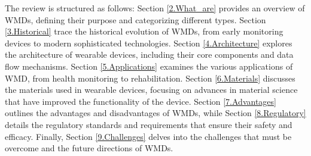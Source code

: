 \documentclass[journal]{IEEEtran}
\begin{document}
The review is structured as follows: Section \ref{2.What_are} provides an overview of WMDs, defining their purpose and categorizing different types. Section \ref{3.Historical} trace the historical evolution of WMDs, from early monitoring devices to modern sophisticated technologies. Section \ref{4.Architecture} explores the architecture of wearable devices, including their core components and data flow mechanisms. Section \ref{5.Applications} examines the various applications of WMD, from health monitoring to rehabilitation. Section \ref{6.Materials} discusses the materials used in wearable devices, focusing on advances in material science that have improved the functionality of the device. Section \ref{7.Advantages} outlines the advantages and disadvantages of WMDs, while Section \ref{8.Regulatory} details the regulatory standards and requirements that ensure their safety and efficacy. Finally, Section \ref{9.Challenges} delves into the challenges that must be overcome and the future directions of WMDs.



%
%

\end{document}
